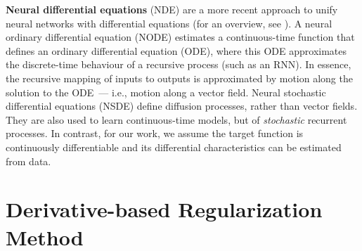 \documentclass{article}
\newcommand{\kibitz}[2]{\ifnum\Comments=1\textcolor{#1}{#2}\fi}
\newcommand{\kizito}[1]{\kibitz{red} {[Kizito: #1]}}
\newcommand{\enrico}[1]{\kibitz{blue} {[Enrico: #1]}}
\begin{document}
\textbf{Neural differential equations} (NDE) are a more recent approach to unify neural networks with differential equations (for an overview, see \cite{Kidger22}).
A neural ordinary differential equation (NODE) \cite{NEURIPS2018_Chen} estimates a continuous-time function that defines an ordinary differential equation (ODE), where this ODE approximates the discrete-time behaviour of a recursive process (such as an RNN). In essence, the recursive mapping of inputs to outputs is approximated by motion along the solution to the ODE~--- i.e., motion along a vector field.
Neural stochastic differential equations (NSDE) \cite{tzen2019neural} define diffusion processes, rather than vector fields. 
They are also used to learn continuous-time models, but of \textit{stochastic} recurrent processes. 
In contrast, for our work, we assume the target function is continuously differentiable and its differential characteristics can be estimated from data. 







\section{Derivative-based Regularization Method}\label{sec:method}
\end{document}
